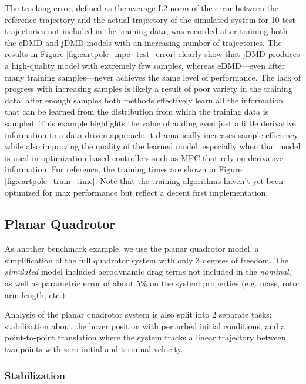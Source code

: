 \documentclass{article}
\begin{document}
      The tracking error, defined as the average L2 norm of the error between the reference 
      trajectory and the actual trajectory of the simulated system for 10 test trajectories not 
      included in the training data, was recorded after training both the eDMD and jDMD models
      with an increasing number of trajectories. The results in Figure
      \ref{fig:cartpole_mpc_test_error} clearly show that jDMD produces a high-quality model with
      extremely few samples, whereas eDMD---even after many training samples---never achieves the 
      same level of performance. The lack of progress with increasing samples is likely a result 
      of poor variety in the training data: after enough samples both methods effectively learn 
      all the information that can be learned from the distribution from which the training data 
      is sampled. This example highlights the value of adding even just a little derivative 
      information to a data-driven approach: it dramatically increases sample efficiency while 
      also improving the quality of the learned model, especially when that model is used in 
      optimization-based controllers such as MPC that rely on derivative information. For 
      reference, the training times are shown in Figure \ref{fig:cartpole_train_time}. Note that 
      the training algorithms haven't yet been optimized for max performance but reflect a decent 
      first implementation.
      
      
      \subsection{Planar Quadrotor}
      As another benchmark example, we use the planar quadrotor model, a simplification of the
      full quadrotor system with only 3 degrees of freedom. The \textit{simulated} model included
      aerodynamic drag terms not included in the \textit{nominal}, as well as parametric error of 
      about 5\% on the system properties (e.g. mass, rotor arm length, etc.).
      
      Analysis of the planar quadrotor system is also split into 2 separate tasks: stabilization
      about the hover position with perturbed initial conditions, and a point-to-point translation
      where the system tracks a linear trajectory between two points with zero initial and 
      terminal velocity.
      
      \subsubsection{Stabilization}
      
\end{document}
